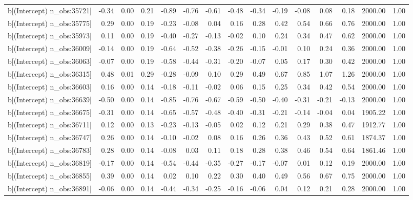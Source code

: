 \begin{table}[ht]
\begin{tabular}{rrrrrrrrrrrrrrr}
  b[(Intercept) n\_obs:35721] & -0.34 & 0.00 & 0.21 & -0.89 & -0.76 & -0.61 & -0.48 & -0.34 & -0.19 & -0.08 & 0.08 & 0.18 & 2000.00 & 1.00 \\ 
  b[(Intercept) n\_obs:35775] & 0.29 & 0.00 & 0.19 & -0.23 & -0.08 & 0.04 & 0.16 & 0.28 & 0.42 & 0.54 & 0.66 & 0.76 & 2000.00 & 1.00 \\ 
  b[(Intercept) n\_obs:35973] & 0.11 & 0.00 & 0.19 & -0.40 & -0.27 & -0.13 & -0.02 & 0.10 & 0.24 & 0.34 & 0.47 & 0.62 & 2000.00 & 1.00 \\ 
  b[(Intercept) n\_obs:36009] & -0.14 & 0.00 & 0.19 & -0.64 & -0.52 & -0.38 & -0.26 & -0.15 & -0.01 & 0.10 & 0.24 & 0.36 & 2000.00 & 1.00 \\ 
  b[(Intercept) n\_obs:36063] & -0.07 & 0.00 & 0.19 & -0.58 & -0.44 & -0.31 & -0.20 & -0.07 & 0.05 & 0.17 & 0.30 & 0.42 & 2000.00 & 1.00 \\ 
  b[(Intercept) n\_obs:36315] & 0.48 & 0.01 & 0.29 & -0.28 & -0.09 & 0.10 & 0.29 & 0.49 & 0.67 & 0.85 & 1.07 & 1.26 & 2000.00 & 1.00 \\ 
  b[(Intercept) n\_obs:36603] & 0.16 & 0.00 & 0.14 & -0.18 & -0.11 & -0.02 & 0.06 & 0.15 & 0.25 & 0.34 & 0.42 & 0.54 & 2000.00 & 1.00 \\ 
  b[(Intercept) n\_obs:36639] & -0.50 & 0.00 & 0.14 & -0.85 & -0.76 & -0.67 & -0.59 & -0.50 & -0.40 & -0.31 & -0.21 & -0.13 & 2000.00 & 1.00 \\ 
  b[(Intercept) n\_obs:36675] & -0.31 & 0.00 & 0.14 & -0.65 & -0.57 & -0.48 & -0.40 & -0.31 & -0.21 & -0.14 & -0.04 & 0.04 & 1905.22 & 1.00 \\ 
  b[(Intercept) n\_obs:36711] & 0.12 & 0.00 & 0.13 & -0.23 & -0.13 & -0.05 & 0.02 & 0.12 & 0.21 & 0.29 & 0.38 & 0.47 & 1912.77 & 1.00 \\ 
  b[(Intercept) n\_obs:36747] & 0.26 & 0.00 & 0.14 & -0.10 & -0.02 & 0.08 & 0.16 & 0.26 & 0.36 & 0.43 & 0.52 & 0.61 & 1874.37 & 1.00 \\ 
  b[(Intercept) n\_obs:36783] & 0.28 & 0.00 & 0.14 & -0.08 & 0.03 & 0.11 & 0.18 & 0.28 & 0.38 & 0.46 & 0.54 & 0.64 & 1861.46 & 1.00 \\ 
  b[(Intercept) n\_obs:36819] & -0.17 & 0.00 & 0.14 & -0.54 & -0.44 & -0.35 & -0.27 & -0.17 & -0.07 & 0.01 & 0.12 & 0.19 & 2000.00 & 1.00 \\ 
  b[(Intercept) n\_obs:36855] & 0.39 & 0.00 & 0.14 & 0.02 & 0.10 & 0.22 & 0.30 & 0.40 & 0.49 & 0.56 & 0.67 & 0.75 & 2000.00 & 1.00 \\ 
  b[(Intercept) n\_obs:36891] & -0.06 & 0.00 & 0.14 & -0.44 & -0.34 & -0.25 & -0.16 & -0.06 & 0.04 & 0.12 & 0.21 & 0.28 & 2000.00 & 1.00 \\ 

\end{tabular}
\end{table}
